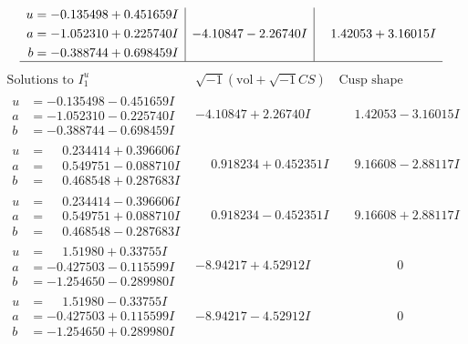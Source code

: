 \documentclass[1p]{elsarticle_modified}
\theoremstyle{definition}
\newcommand{\I}{\sqrt{-1}}
\begin{document}
$$\begin{array}{c|c|c}
\begin{aligned}
u &= -0.135498 + 0.451659 I \\
a &= -1.052310 + 0.225740 I \\
b &= -0.388744 + 0.698459 I\end{aligned}
 & -4.10847 - 2.26740 I & \phantom{-}1.42053 + 3.16015 I\\
 \hline 
 \end{array}$$\newpage$$\begin{array}{c|c|c}  
\text{Solutions to }I^u_{1}& \I (\text{vol} + \sqrt{-1}CS) & \text{Cusp shape}\\
 \hline 
\begin{aligned}
u &= -0.135498 - 0.451659 I \\
a &= -1.052310 - 0.225740 I \\
b &= -0.388744 - 0.698459 I\end{aligned}
 & -4.10847 + 2.26740 I & \phantom{-}1.42053 - 3.16015 I \\ \hline\begin{aligned}
u &= \phantom{-}0.234414 + 0.396606 I \\
a &= \phantom{-}0.549751 - 0.088710 I \\
b &= \phantom{-}0.468548 + 0.287683 I\end{aligned}
 & \phantom{-}0.918234 + 0.452351 I & \phantom{-}9.16608 - 2.88117 I \\ \hline\begin{aligned}
u &= \phantom{-}0.234414 - 0.396606 I \\
a &= \phantom{-}0.549751 + 0.088710 I \\
b &= \phantom{-}0.468548 - 0.287683 I\end{aligned}
 & \phantom{-}0.918234 - 0.452351 I & \phantom{-}9.16608 + 2.88117 I \\ \hline\begin{aligned}
u &= \phantom{-}1.51980 + 0.33755 I \\
a &= -0.427503 - 0.115599 I \\
b &= -1.254650 - 0.289980 I\end{aligned}
 & -8.94217 + 4.52912 I & \phantom{-0.000000 } 0 \\ \hline\begin{aligned}
u &= \phantom{-}1.51980 - 0.33755 I \\
a &= -0.427503 + 0.115599 I \\
b &= -1.254650 + 0.289980 I\end{aligned}
 & -8.94217 - 4.52912 I & \phantom{-0.000000 } 0 \\ \hline\begin{aligned}

\end{aligned}
\end{array}$$
\end{document}
